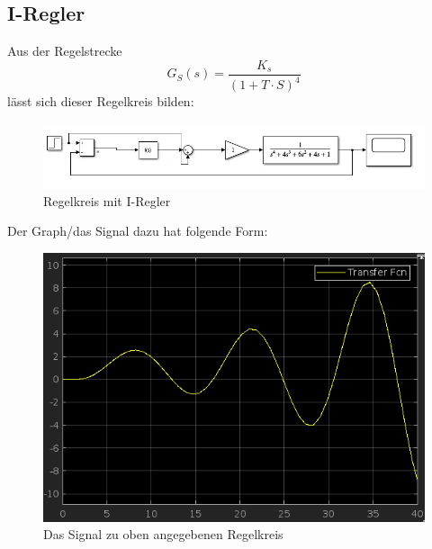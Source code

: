 \documentclass{article}
\begin{document}
		\subsection{I-Regler}
			Aus der Regelstrecke 
			$$G_S(s) = \frac{K_s}{(1 + T\cdot S)^4}$$
			lässt sich dieser Regelkreis bilden:
			\begin{figure}[h]
				\includegraphics[scale=0.6, center]{4_b_Blockschaltbild.png}
				\caption{Regelkreis mit I-Regler}
				\label{fig35: Blockschaltbild_I_Regler}
			\end{figure}
			Der Graph/das Signal dazu hat folgende Form:
			\begin{figure}[h]
				\includegraphics[scale = 0.6, center]{4_b_Graph.png}
				\caption{Das Signal zu oben angegebenen Regelkreis}
				\label{fig36: 4_b_Graph}
			\end{figure}
\newpage
\end{document}
